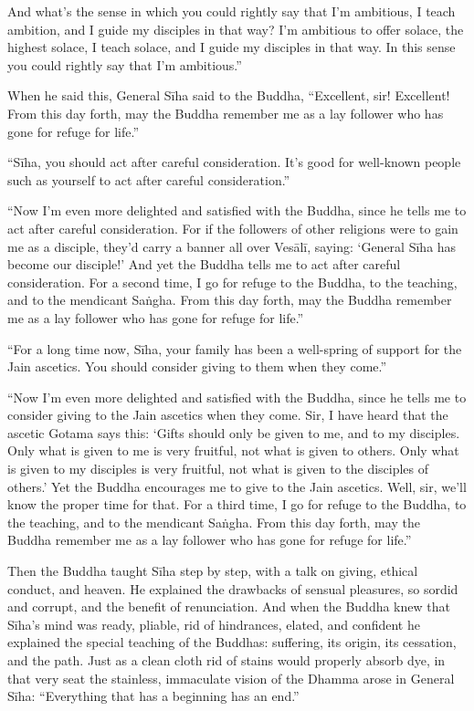 \documentclass[12pt,openany]{book}%
\begin{document}
And what’s the sense in which you could rightly say that I’m ambitious, I teach ambition, and I guide my disciples in that way? I’m ambitious to offer solace, the highest solace, I teach solace, and I guide my disciples in that way. In this sense you could rightly say that I’m ambitious.” 

When he said this, General \textsanskrit{Sīha} said to the Buddha, “Excellent, sir! Excellent! From this day forth, may the Buddha remember me as a lay follower who has gone for refuge for life.” 

“\textsanskrit{Sīha}, you should act after careful consideration. It’s good for well-known people such as yourself to act after careful consideration.” 

“Now I’m even more delighted and satisfied with the Buddha, since he tells me to act after careful consideration. For if the followers of other religions were to gain me as a disciple, they’d carry a banner all over \textsanskrit{Vesālī}, saying: ‘General \textsanskrit{Sīha} has become our disciple!’ And yet the Buddha tells me to act after careful consideration. For a second time, I go for refuge to the Buddha, to the teaching, and to the mendicant \textsanskrit{Saṅgha}. From this day forth, may the Buddha remember me as a lay follower who has gone for refuge for life.” 

“For a long time now, \textsanskrit{Sīha}, your family has been a well-spring of support for the Jain ascetics. You should consider giving to them when they come.” 

“Now I’m even more delighted and satisfied with the Buddha, since he tells me to consider giving to the Jain ascetics when they come. Sir, I have heard that the ascetic Gotama says this: ‘Gifts should only be given to me, and to my disciples. Only what is given to me is very fruitful, not what is given to others. Only what is given to my disciples is very fruitful, not what is given to the disciples of others.’ Yet the Buddha encourages me to give to the Jain ascetics. Well, sir, we’ll know the proper time for that. For a third time, I go for refuge to the Buddha, to the teaching, and to the mendicant \textsanskrit{Saṅgha}. From this day forth, may the Buddha remember me as a lay follower who has gone for refuge for life.” 

Then the Buddha taught \textsanskrit{Sīha} step by step, with a talk on giving, ethical conduct, and heaven. He explained the drawbacks of sensual pleasures, so sordid and corrupt, and the benefit of renunciation. And when the Buddha knew that \textsanskrit{Sīha}’s mind was ready, pliable, rid of hindrances, elated, and confident he explained the special teaching of the Buddhas: suffering, its origin, its cessation, and the path. Just as a clean cloth rid of stains would properly absorb dye, in that very seat the stainless, immaculate vision of the Dhamma arose in General \textsanskrit{Sīha}: “Everything that has a beginning has an end.” 
\end{document}
